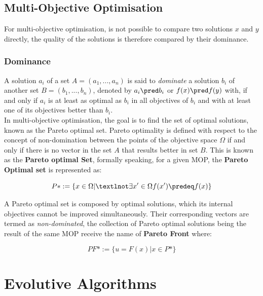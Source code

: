 \subsection{Multi-Objective Optimisation}

For multi-objective optimisation, is not possible to compare two solutions $x$ and $y$ directly, the quality of the solutions is therefore compared by their dominance.\\

\subsubsection{Dominance}

A solution $a_i$ of a set $A = (a_1,...,a_n)$ is said to \textit{dominate} a solution $b_i$ of another set $B = (b_1,...,b_n)$, denoted by $a_i \pred b_i$ or $f(x) \pred f(y)$ with, if and only if $a_i$ is at least as optimal as $b_i$ in all objectives of $b_i$ and with at least one of its objectives better than $b_i$.\\

In multi-objective optimisation, the goal is to find the set of optimal solutions, known as the Pareto optimal set. Pareto optimality is defined with respect to the concept of non-domination between the points of the objective space $\Omega$ if and only if there is no vector in the set $A$ that results better in set $B$. This is known as the \textbf{Pareto optimal Set}, formally speaking, for a given MOP, the \textbf{Pareto Optimal set} is represented as:

\begin{equation}
    P* := \{x \in \Omega | ¬\exists x' \in \Omega f(x') \predeq f(x) \}
\end{equation}

A Pareto optimal set is composed by optimal solutions, which its internal objectives cannot be improved simultaneously. Their corresponding vectors are termed as \textit{non-dominated}, the collection of Pareto optimal solutions being the result of the same MOP receive the name of \textbf{Pareto Front} where:

\begin{equation}
    PF* := \{u= F(x) | x \in P*\}
\end{equation}


\section{Evolutive Algorithms}

